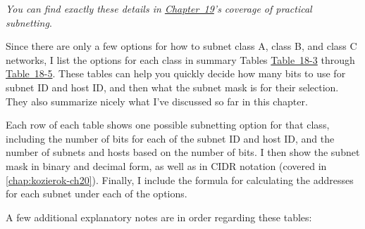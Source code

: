 \documentclass[b5paper,11pt]{memoir}
\begin{document}
{\emph{You can find exactly these details in
\protect\hyperlink{ch19.html}{Chapter~19}'s coverage of practical
subnetting}}.

\protect\hypertarget{ch18s07.html}{}{}

\protect\hypertarget{ch18s07.htmlux5cux23idx-CHP-18-0741}{}{}Since there
are only a few options for how to subnet class A, class B, and class C
networks, I list the options for each class in summary Tables
\protect\hyperlink{ch18s07.htmlux5cux23subnetting_summary_table_for_class_a_net}{Table~18-3}
through
\protect\hyperlink{ch18s07.htmlux5cux23subnetting_summary_table_for_class_c_net}{Table~18-5}.
These tables can help you quickly decide how many bits to use for subnet
ID and host ID, and then what the subnet mask is for their selection.
They also summarize nicely what I've discussed so far in this chapter.

Each row of each table shows one possible subnetting option for that
class, including the number of bits for each of the subnet ID and host
ID, and the number of subnets and hosts based on the number of bits. I
then show the subnet mask in binary and decimal form, as well as in CIDR
notation (covered in \vref{chap:kozierok-ch20}).
Finally, I include the formula for calculating the addresses for each
subnet under each of the options.

A few additional explanatory notes are in order regarding these tables:
\end{document}
